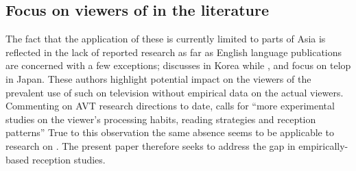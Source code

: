 \documentclass[output=paper]{langsci/langscibook}
\begin{document}
\subsection{Focus on viewers of  in the literature}

The fact that the application of these  is currently limited to parts of Asia is reflected in the lack of reported research as far as English language publications are concerned with a few exceptions; \citet{Park2009} discusses  in Korea while \citet{ohagan2010}, \citet{Sasamoto2014} and \citet{maree2015} focus on telop in Japan. These authors highlight potential impact on the viewers of the prevalent use of such  on television without empirical data on the actual viewers. Commenting on AVT research directions to date, \citet[57]{gambier2013} calls for ``more experimental studies on the viewer's processing habits, reading strategies and reception patterns'' True to this observation the same absence seems to be applicable to research on . The present paper therefore seeks to address the gap in empirically-based reception studies.
\end{document}
